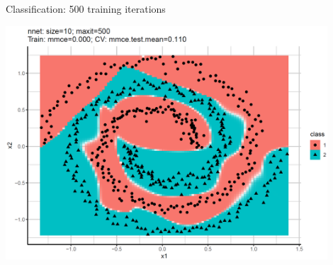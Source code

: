 \begin{frame}{Classification: 500 training iterations}
{\begin{center}
\includegraphics[width=0.9\textwidth]{plots/class-n10.png}
\end{center}

}


\end{frame}
